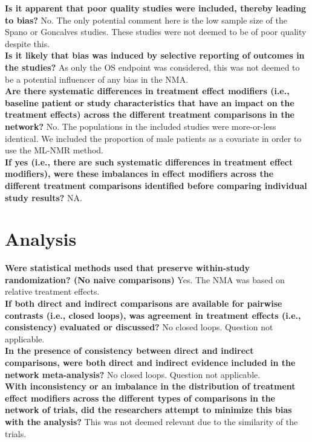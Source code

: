\textbf{Is it apparent that poor quality studies were included, thereby
leading to bias?} No. The only potential comment here is the low sample size of the Spano or Goncalves studies. These studies were not deemed to be of poor quality despite this.\\

\textbf{Is it likely that bias was induced by selective reporting of
outcomes in the studies?} As only the OS endpoint was considered, this was not deemed to be a potential influencer of any bias in the NMA.\\

\textbf{Are there systematic differences in treatment effect modifiers
(i.e., baseline patient or study characteristics that have an
impact on the treatment effects) across the different treatment
comparisons in the network?} No. The populations in the included studies were more-or-less identical. We included the proportion of male patients as a covariate in order to use the ML-NMR method.\\

\textbf{If yes (i.e., there are such systematic differences in treatment
effect modifiers), were these imbalances in effect modifiers
across the different treatment comparisons identified before
comparing individual study results?} NA.\\

\section{Analysis}
\textbf{Were statistical methods used that preserve within-study
randomization? (No naive comparisons)} Yes. The NMA was based on relative treatment effects. \\

\textbf{If both direct and indirect comparisons are available for
pairwise contrasts (i.e., closed loops), was agreement in
treatment effects (i.e., consistency) evaluated or discussed?} No closed loops. Question not applicable. \\

\textbf{In the presence of consistency between direct and indirect
comparisons, were both direct and indirect evidence included in
the network meta-analysis?} No closed loops. Question not applicable. \\

\textbf{With inconsistency or an imbalance in the distribution of
treatment effect modifiers across the different types of
comparisons in the network of trials, did the researchers
attempt to minimize this bias with the analysis?} This was not deemed relevant due to the similarity of the trials. \\

